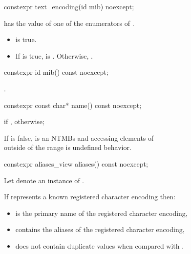 \documentclass{wg21}
\begin{document}
\begin{addedblock}
\begin{itemdecl}
constexpr text_encoding(id mib) noexcept;
\end{itemdecl}

\begin{itemdescr}
    \preconditions
     has the value of one of the enumerators of .

    \postcondition
    \begin{itemize}
       \item  {} is true.
       \item  If  is true,  is . Otherwise,
       .
    \end{itemize}
\end{itemdescr}


\begin{itemdecl}
constexpr id mib() const noexcept;
\end{itemdecl}

\begin{itemdescr}
\returns {}.

\end{itemdescr}

\begin{itemdecl}
constexpr const char* name() const noexcept;
\end{itemdecl}
\begin{itemdescr}
\returns {} if ,  otherwise;

\remarks
If  is false,  is an NTMBs and accessing elements of\\
 outside of the range  is undefined behavior.
\end{itemdescr}

\begin{itemdecl}
constexpr aliases_view aliases() const noexcept;
\end{itemdecl}


\begin{itemdescr}

Let  denote an instance of .

\pnum If  represents a known registered character encoding then:
\begin{itemize}
    \item {} is the  primary name of the registered character encoding,
    \item {} contains the aliases of the registered character encoding,
    \item {} does not contain duplicate values when compared with .
\end{itemize}


\end{itemdescr}
\end{addedblock}
\end{document}
